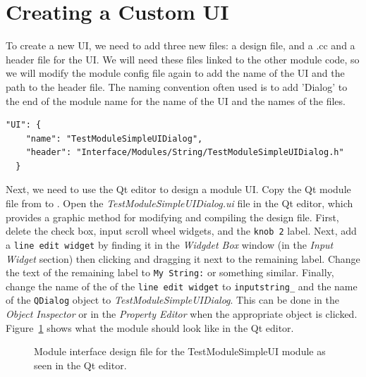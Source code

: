 \documentclass[fleqn,11pt,openany]{book}
\begin{document}
\section{Creating a Custom UI}
\label{sec:addUI}

To create a new UI, we need to add three new files: a design file, and a .cc and a header file for the UI.  
We will need these files linked to the other module code, so we will modify the module config file again to add the name of the UI and the path to the header file. 
The naming convention often used is to add 'Dialog' to the end of the module name for the name of the UI and the names of the files.
\begin{verbatim}
"UI": {
    "name": "TestModuleSimpleUIDialog",
    "header": "Interface/Modules/String/TestModuleSimpleUIDialog.h"
  }
\end{verbatim}

Next, we need to use the Qt editor to design a module UI.  
Copy the Qt module file from \emph{} to \emph{}.  
Open the \emph{TestModuleSimpleUIDialog.ui} file in the Qt editor, which provides a graphic method for modifying and compiling the design file.
First, delete the check box, input scroll wheel widgets, and the \verb|knob 2| label.
Next, add a \verb|line edit widget| by finding it in the \emph{Widgdet Box} window (in the \emph{Input Widget} section) then clicking and dragging it next to the remaining label.  
Change the text of the remaining label to \verb|My String:| or something similar.
Finally, change the name of the of the \verb|line edit widget| to \verb|inputstring_| and the name of the \verb|QDialog| object to \emph{TestModuleSimpleUIDialog}.  
This can be done in the \emph{Object Inspector} or in the \emph{Property Editor} when the appropriate object is clicked.  
Figure~\ref{fig:simpleUI} shows what the module should look like in the Qt editor.

\begin{figure}[H]
\caption{Module interface design file for the TestModuleSimpleUI module as seen in the Qt editor.}
\label{fig:simpleUI}
\end{figure}
\end{document}
